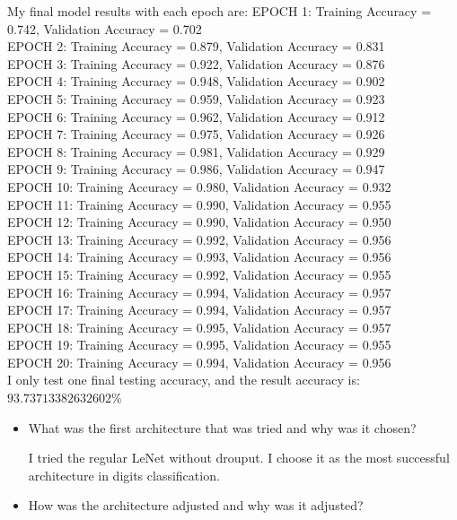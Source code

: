 \documentclass[paper=a4, fontsize=11pt]{scrartcl}
\numberwithin{equation}{section}		%
\numberwithin{figure}{section}			%
\numberwithin{table}{section}				%
\begin{document}
\begin{enumerate}
My final model results with each epoch are:
EPOCH 1: Training Accuracy = 0.742, Validation Accuracy = 0.702 \\
EPOCH 2: Training Accuracy = 0.879, Validation Accuracy = 0.831 \\
EPOCH 3: Training Accuracy = 0.922, Validation Accuracy = 0.876 \\
EPOCH 4: Training Accuracy = 0.948, Validation Accuracy = 0.902 \\
EPOCH 5: Training Accuracy = 0.959, Validation Accuracy = 0.923 \\
EPOCH 6: Training Accuracy = 0.962, Validation Accuracy = 0.912 \\
EPOCH 7: Training Accuracy = 0.975, Validation Accuracy = 0.926 \\
EPOCH 8: Training Accuracy = 0.981, Validation Accuracy = 0.929 \\
EPOCH 9: Training Accuracy = 0.986, Validation Accuracy = 0.947 \\
EPOCH 10: Training Accuracy = 0.980, Validation Accuracy = 0.932 \\
EPOCH 11: Training Accuracy = 0.990, Validation Accuracy = 0.955 \\
EPOCH 12: Training Accuracy = 0.990, Validation Accuracy = 0.950 \\
EPOCH 13: Training Accuracy = 0.992, Validation Accuracy = 0.956 \\
EPOCH 14: Training Accuracy = 0.993, Validation Accuracy = 0.956 \\
EPOCH 15: Training Accuracy = 0.992, Validation Accuracy = 0.955 \\
EPOCH 16: Training Accuracy = 0.994, Validation Accuracy = 0.957 \\
EPOCH 17: Training Accuracy = 0.994, Validation Accuracy = 0.957 \\
EPOCH 18: Training Accuracy = 0.995, Validation Accuracy = 0.957 \\
EPOCH 19: Training Accuracy = 0.995, Validation Accuracy = 0.955 \\
EPOCH 20: Training Accuracy = 0.994, Validation Accuracy = 0.956 \\

I only test one final testing accuracy, and the result accuracy is: $93.73713382632602\%$
    \begin{itemize}
      \item{What was the first architecture that was tried and why was it chosen?}
      
      I tried the regular LeNet without drouput. I choose it as the most successful architecture in digits classification.
      \item{How was the architecture adjusted and why was it adjusted? }
      

\end{itemize}
\end{enumerate}
\end{document}
